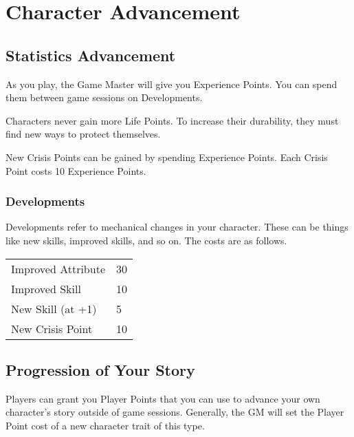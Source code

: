 \chapter{Character Advancement}

\begin{multicols}{2}

\section{Statistics Advancement}

As you play, the Game Master will give you Experience Points. You 
can spend them between game sessions on Developments.

Characters never gain more Life Points. To increase their durability, 
they must find new ways to protect themselves.

New Crisis Points can be gained by spending Experience Points. Each 
Crisis Point costs 10 Experience Points.

\subsection{Developments}

Developments refer to mechanical changes in your character. These can
be things like new skills, improved skills, and so on. The costs are
as follows.

\begin{center}
\begin{xtabular}{|l|l|}
Improved Attribute & 30 \\
Improved Skill & 10 \\
New Skill (at +1) & 5 \\
New Crisis Point & 10 \\
\hline
\end{xtabular}
\end{center}

\section{Progression of Your Story}

Players can grant you Player Points that you can use to advance your own 
character's story outside of game sessions. Generally, the GM will set the
Player Point cost of a new character trait of this type.

\end{multicols}
